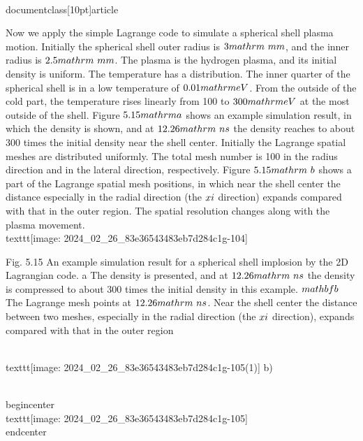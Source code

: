 \\documentclass[10pt]{article}
\begin{document}
{Now we apply the simple Lagrange code to simulate a spherical shell plasma motion. Initially the spherical shell outer radius is $3 \\mathrm{~mm}$, and the inner radius is $2.5 \\mathrm{~mm}$. The plasma is the hydrogen plasma, and its initial density is uniform. The temperature has a distribution. The inner quarter of the spherical shell is in a low temperature of $0.01 \\mathrm{eV}$. From the outside of the cold part, the temperature rises linearly from 100 to $300 \\mathrm{eV}$ at the most outside of the shell. Figure $5.15 \\mathrm{a}$ shows an example simulation result, in which the density is shown, and at $12.26 \\mathrm{~ns}$ the density reaches to about 300 times the initial density near the shell center. Initially the Lagrange spatial meshes are distributed uniformly. The total mesh number is 100 in the radius direction and in the lateral direction, respectively. Figure $5.15 \\mathrm{~b}$ shows a part of the Lagrange spatial mesh positions, in which near the shell center the distance especially in the radial direction (the $\\xi$ direction) expands compared with that in the outer region. The spatial resolution changes along with the plasma movement.
\\texttt{[image: 2024\_02\_26\_83e36543483eb7d284c1g-104]}

Fig. 5.15 An example simulation result for a spherical shell implosion by the 2D Lagrangian code. a The density is presented, and at $12.26 \\mathrm{~ns}$ the density is compressed to about 300 times the initial density in this example. $\\mathbf{b}$ The Lagrange mesh points at $12.26 \\mathrm{~ns}$. Near the shell center the distance between two meshes, especially in the radial direction (the $\\xi$ direction), expands compared with that in the outer region

\\texttt{[image: 2024\_02\_26\_83e36543483eb7d284c1g-105(1)]}
b)

\\begin{center}
\\texttt{[image: 2024\_02\_26\_83e36543483eb7d284c1g-105]}
\\end{center}

}
\end{document}
